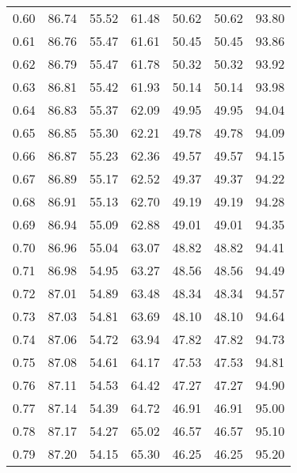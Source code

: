 \begin{tabular}{|c|c|c|c|c|c|c|}
      0.60 &     86.74 &     55.52 &      61.48 &   50.62 &      50.62 &         93.80 \\
      0.61 &     86.76 &     55.47 &      61.61 &   50.45 &      50.45 &         93.86 \\
      0.62 &     86.79 &     55.47 &      61.78 &   50.32 &      50.32 &         93.92 \\
      0.63 &     86.81 &     55.42 &      61.93 &   50.14 &      50.14 &         93.98 \\
      0.64 &     86.83 &     55.37 &      62.09 &   49.95 &      49.95 &         94.04 \\
      0.65 &     86.85 &     55.30 &      62.21 &   49.78 &      49.78 &         94.09 \\
      0.66 &     86.87 &     55.23 &      62.36 &   49.57 &      49.57 &         94.15 \\
      0.67 &     86.89 &     55.17 &      62.52 &   49.37 &      49.37 &         94.22 \\
      0.68 &     86.91 &     55.13 &      62.70 &   49.19 &      49.19 &         94.28 \\
      0.69 &     86.94 &     55.09 &      62.88 &   49.01 &      49.01 &         94.35 \\
      0.70 &     86.96 &     55.04 &      63.07 &   48.82 &      48.82 &         94.41 \\
      0.71 &     86.98 &     54.95 &      63.27 &   48.56 &      48.56 &         94.49 \\
      0.72 &     87.01 &     54.89 &      63.48 &   48.34 &      48.34 &         94.57 \\
      0.73 &     87.03 &     54.81 &      63.69 &   48.10 &      48.10 &         94.64 \\
      0.74 &     87.06 &     54.72 &      63.94 &   47.82 &      47.82 &         94.73 \\
      0.75 &     87.08 &     54.61 &      64.17 &   47.53 &      47.53 &         94.81 \\
      0.76 &     87.11 &     54.53 &      64.42 &   47.27 &      47.27 &         94.90 \\
      0.77 &     87.14 &     54.39 &      64.72 &   46.91 &      46.91 &         95.00 \\
      0.78 &     87.17 &     54.27 &      65.02 &   46.57 &      46.57 &         95.10 \\
      0.79 &     87.20 &     54.15 &      65.30 &   46.25 &      46.25 &         95.20 \\

\end{tabular}
